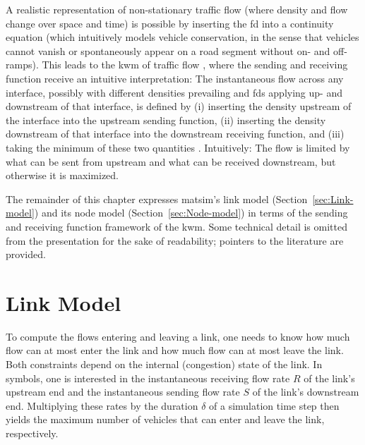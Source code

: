 A realistic representation of non-stationary traffic flow (where density
and flow change over space and time) is possible by inserting the
\gls{fd} into a continuity equation (which intuitively models vehicle conservation,
in the sense that vehicles cannot vanish or spontaneously appear on
a road segment without on- and off-ramps). This leads to the \gls{kwm} 
of traffic flow \citep[KWM;][]{lighthill-1955,richards-1956},
where the sending and receiving function receive an intuitive interpretation:
The instantaneous flow across any interface, possibly with different
densities prevailing and \glspl{fd} applying up- and downstream of that interface,
is defined by (i) inserting the density upstream of the interface
into the upstream sending function, (ii) inserting the density downstream
of that interface into the downstream receiving function, and (iii)
taking the minimum of these two quantities \citep{daganzo-1994,lebacque-1996}.
Intuitively: The flow is limited by what can be sent from upstream
and what can be received downstream, but otherwise it is maximized.

The remainder of this chapter expresses \gls{matsim}\textquoteright{}s link
model (Section~\ref{sec:Link-model}) and its node model (Section~\ref{sec:Node-model})
in terms of the sending and receiving function framework of the \gls{kwm}.
Some technical detail is omitted from the presentation for the sake
of readability; pointers to the literature are provided.

\section{\label{sec:Link-model}Link Model}
To compute the flows entering and leaving a link, one needs to know
how much flow can at most enter the link and how much flow can at
most leave the link. Both constraints depend on the internal (congestion)
state of the link. In symbols, one is interested in the instantaneous
receiving flow rate $R$ of the link's upstream end and the instantaneous
sending flow rate $S$ of the link's downstream end. Multiplying these
rates by the duration $\delta$ of a simulation time step then yields
the maximum number of vehicles that can enter and leave the link,
respectively.

